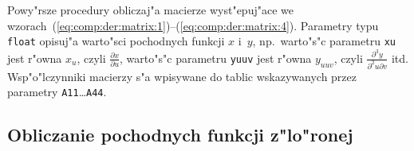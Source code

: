 \hspace*{\parindent}Powy"rsze procedury obliczaj"a macierze wyst"epuj"ace we
wzorach~(\ref{eq:comp:der:matrix:1})--(\ref{eq:comp:der:matrix:4}).
Parametry typu \texttt{float} opisuj"a warto"sci pochodnych funkcji
$x$ i~$y$, np.\ warto"s"c parametru \texttt{xu} jest r"owna $x_u$, czyli
$\frac{\partial x}{\partial u}$, warto"s"c parametru \texttt{yuuv}
jest r"owna $y_{uuv}$, czyli $\frac{\partial^3y}{\partial^2u\partial v}$
itd. Wsp"o"lczynniki macierzy s"a wpisywane do tablic wskazywanych przez
parametry \texttt{A11}\ldots\texttt{A44}.


\subsection{Obliczanie pochodnych funkcji z"lo"ronej}


